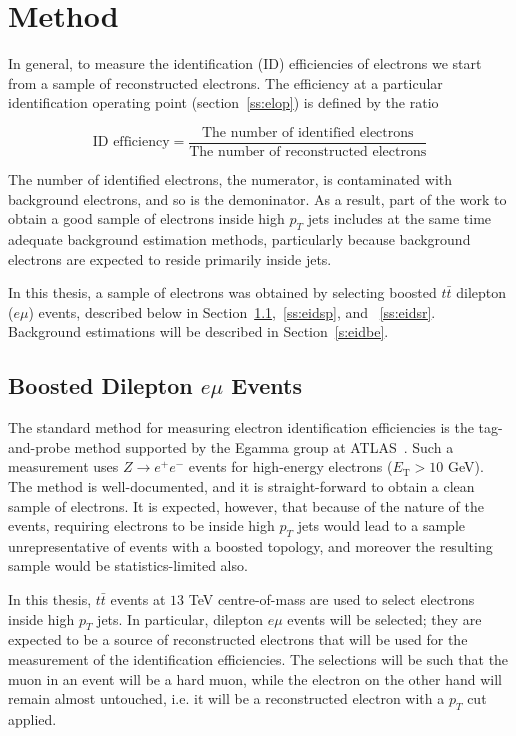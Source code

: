 \section{Method}\label{s:eidmet}

In general, to measure the identification (ID) efficiencies of electrons we
start from a sample of reconstructed electrons. The efficiency at a particular
identification operating point (section~\ref{ss:elop}) is defined by the ratio

$$
	\text{ID efficiency} = \frac{\text{The number of identified
			electrons}}{\text{The number of reconstructed electrons}}
$$

\vspace{3mm}

The number of identified electrons, the numerator, is contaminated with
background electrons, and so is the demoninator. As a result, part of the work
to obtain a good sample of electrons inside high $p_T$ jets includes at the
same time adequate background estimation methods, particularly because
background electrons are expected to reside primarily inside jets.


In this thesis, a sample of electrons was obtained by selecting boosted
$t\bar{t}$ dilepton ($e\mu$) events, described below in
Section~\ref{ss:eidtp},~\ref{ss:eidsp}, and ~\ref{ss:eidsr}. Background
estimations will be described in Section~\ref{s:eidbe}.

\subsection{Boosted Dilepton $e\mu$ Events}\label{ss:eidtp}

The standard method for measuring electron identification efficiencies is the
tag-and-probe method supported by the Egamma group at ATLAS~\cite{eleffme}.
Such a measurement uses $Z\to e^+e^-$ events for high-energy electrons
($E_{\text{T}} > 10$ GeV). The method is well-documented, and it is
straight-forward to obtain a clean sample of electrons. It is expected,
however, that because of the nature of the events, requiring electrons to be
inside high $p_T$ jets would lead to a sample unrepresentative of events with a
boosted topology, and moreover the resulting sample would be statistics-limited
also.


In this thesis, $t\bar{t}$ events at $13$ TeV centre-of-mass are used to select
electrons inside high $p_T$ jets. In particular, dilepton $e\mu$ events will be
selected; they are expected to be a source of reconstructed electrons that will
be used for the measurement of the identification efficiencies. The selections
will be such that the muon in an event will be a hard muon, while the electron
on the other hand will remain almost untouched, i.e. it will be a reconstructed
electron with a $p_T$ cut applied.

